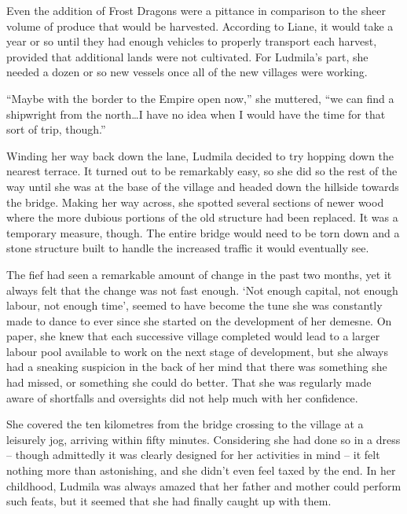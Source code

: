  

Even the addition of Frost Dragons were a pittance in comparison to the sheer volume of produce that would be harvested. According to Liane, it would take a year or so until they had enough vehicles to properly transport each harvest, provided that additional lands were not cultivated. For Ludmila’s part, she needed a dozen or so new vessels once all of the new villages were working.

 

“Maybe with the border to the Empire open now,” she muttered, “we can find a shipwright from the north…I have no idea when I would have the time for that sort of trip, though.”

 

Winding her way back down the lane, Ludmila decided to try hopping down the nearest terrace. It turned out to be remarkably easy, so she did so the rest of the way until she was at the base of the village and headed down the hillside towards the bridge. Making her way across, she spotted several sections of newer wood where the more dubious portions of the old structure had been replaced. It was a temporary measure, though. The entire bridge would need to be torn down and a stone structure built to handle the increased traffic it would eventually see.

 

The fief had seen a remarkable amount of change in the past two months, yet it always felt that the change was not fast enough. ‘Not enough capital, not enough labour, not enough time’, seemed to have become the tune she was constantly made to dance to ever since she started on the development of her demesne. On paper, she knew that each successive village completed would lead to a larger labour pool available to work on the next stage of development, but she always had a sneaking suspicion in the back of her mind that there was something she had missed, or something she could do better. That she was regularly made aware of shortfalls and oversights did not help much with her confidence.

 

She covered the ten kilometres from the bridge crossing to the village at a leisurely jog, arriving within fifty minutes. Considering she had done so in a dress – though admittedly it was clearly designed for her activities in mind – it felt nothing more than astonishing, and she didn’t even feel taxed by the end. In her childhood, Ludmila was always amazed that her father and mother could perform such feats, but it seemed that she had finally caught up with them.

